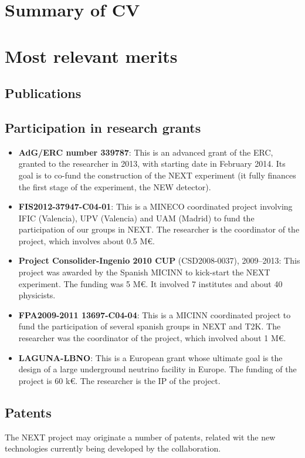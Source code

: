 \documentclass[a4paper,11pt,oneside]{article}
\begin{document}
\section{Summary of CV}

\section{Most relevant merits}
\subsection{Publications}

\subsection{Participation in research grants}
\begin{itemize}

\item {\bf AdG/ERC number 339787}: This is an advanced grant of the ERC, granted to the researcher in 2013, with starting date in February 2014. Its goal is to co-fund the construction of the NEXT experiment (it fully finances the first stage of the experiment, the NEW detector). 
% 
\item {\bf FIS2012-37947-C04-01}: This is a MINECO coordinated project involving IFIC (Valencia),  UPV (Valencia) and UAM (Madrid) to fund the participation of our groups in NEXT. The researcher is the coordinator of the project, which involves about 0.5 M\euro.
\item {\bf Project Consolider-Ingenio 2010 CUP} (CSD2008-0037), 2009--2013: This project was awarded by the Spanish MICINN to kick-start the NEXT experiment. The funding was 5 M\euro. It involved 7 institutes and about 40 physicists. 
\item {\bf FPA2009-2011 13697-C04-04}: This is a MICINN coordinated project to fund the participation of several spanish groups in NEXT and T2K. The researcher was the coordinator of the project, which involved about 1 M\euro.
\item {\bf LAGUNA-LBNO}: This is a European grant whose ultimate goal is the design of a large underground neutrino facility in Europe. The funding of the project is 60 k\euro. The researcher is the IP of the project. 
\end{itemize}
%
\subsection{Patents}
The NEXT project may originate a number of patents, related wit the new technologies currently being developed by the collaboration.
\end{document}
